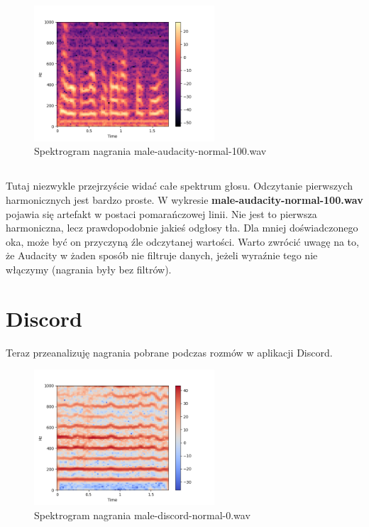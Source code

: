 \documentclass[a4paper,12pt]{extarticle}
\begin{document}
\newpage

\begin{figure}[h]
\centering
\includegraphics[width=0.6\textwidth]{audacity-2}
\caption{Spektrogram nagrania male-audacity-normal-100.wav}
\end{figure}

\subsection*{}
Tutaj niezwykle przejrzyście widać całe spektrum głosu. Odczytanie pierwszych harmonicznych jest bardzo proste. W wykresie \textbf{male-audacity-normal-100.wav} pojawia się artefakt w postaci pomarańczowej linii. Nie jest to pierwsza harmoniczna, lecz prawdopodobnie jakieś odgłosy tła. Dla mniej doświadczonego oka, może być on przyczyną źle odczytanej wartości. Warto zwrócić uwagę na to, że Audacity w żaden sposób nie filtruje danych, jeżeli wyraźnie tego nie włączymy (nagrania były bez filtrów). \cite{audacity}

\newpage

\section*{Discord}

Teraz przeanalizuję nagrania pobrane podczas rozmów w aplikacji Discord.

\begin{figure}[h]
\centering
\includegraphics[width=0.6\textwidth]{discord-0}
\caption{Spektrogram nagrania male-discord-normal-0.wav}
\end{figure}
\end{document}
